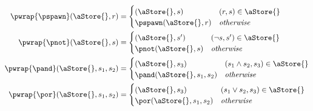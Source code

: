 \newcommand{\wrappedprimspacer}{\mbox{\hspace{1.8cm}} & \\[-3ex]}
\centering
\begin{align*}
\pwrap{\pspawn}(\aStore{},r) &=
  \begin{cases}
    \wrappedprimspacer
    (\aStore{},s) & (r,s) \in \aStore{} \\
    \pspawn(\aStore{},r) & \mathit{otherwise}
  \end{cases} \\
\pwrap{\pnot}(\aStore{},s) &=
  \begin{cases}
    \wrappedprimspacer
    (\aStore{},s') & (\neg s, s') \in \aStore{} \\
    \pnot(\aStore{},s) & \mathit{otherwise}
  \end{cases} \\
\pwrap{\pand}(\aStore{},s_1,s_2) &=
  \begin{cases}
    \wrappedprimspacer
    (\aStore{},s_3) & (s_1 \wedge s_2, s_3) \in \aStore{} \\
    \pand(\aStore{},s_1,s_2) & \mathit{otherwise}
  \end{cases} \\
\pwrap{\por}(\aStore{},s_1,s_2) &=
  \begin{cases}
    \wrappedprimspacer
    (\aStore{},s_3) & (s_1 \vee s_2, s_3) \in \aStore{} \\
    \por(\aStore{},s_1,s_2) & \mathit{otherwise}
  \end{cases} \\
\end{align*}
